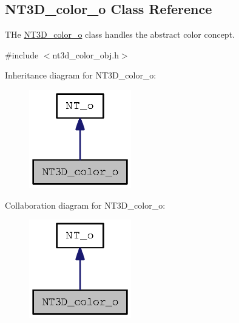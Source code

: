 \subsection{NT3D\_\-color\_\-o Class Reference}
\label{class_n_t3_d__color__o}


THe \hyperlink{class_n_t3_d__color__o}{NT3D\_\-color\_\-o} class handles the abstract color concept.  




{\ttfamily \#include $<$nt3d\_\-color\_\-obj.h$>$}



Inheritance diagram for NT3D\_\-color\_\-o:
\nopagebreak
\begin{figure}[H]
\begin{center}
\leavevmode
\includegraphics[width=126pt]{class_n_t3_d__color__o__inherit__graph}
\end{center}
\end{figure}


Collaboration diagram for NT3D\_\-color\_\-o:
\nopagebreak
\begin{figure}[H]
\begin{center}
\leavevmode
\includegraphics[width=126pt]{class_n_t3_d__color__o__coll__graph}
\end{center}
\end{figure}
